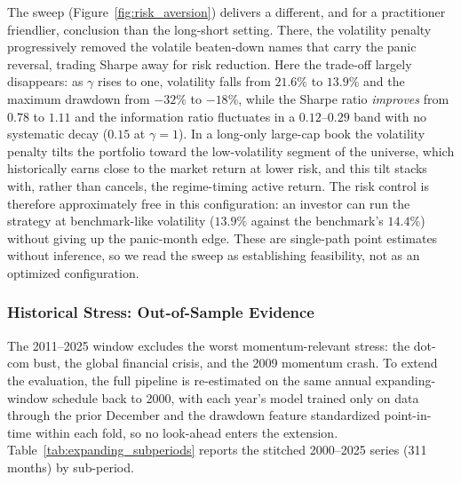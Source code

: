 The sweep (Figure~\ref{fig:risk_aversion}) delivers a different, and for a practitioner friendlier, conclusion than the long-short setting. There, the volatility penalty progressively removed the volatile beaten-down names that carry the panic reversal, trading Sharpe away for risk reduction. Here the trade-off largely disappears: as $\gamma$ rises to one, volatility falls from $21.6\%$ to $13.9\%$ and the maximum drawdown from $-32\%$ to $-18\%$, while the Sharpe ratio \emph{improves} from $0.78$ to $1.11$ and the information ratio fluctuates in a $0.12$--$0.29$ band with no systematic decay ($0.15$ at $\gamma = 1$). In a long-only large-cap book the volatility penalty tilts the portfolio toward the low-volatility segment of the universe, which historically earns close to the market return at lower risk, and this tilt stacks with, rather than cancels, the regime-timing active return. The risk control is therefore approximately free in this configuration: an investor can run the strategy at benchmark-like volatility ($13.9\%$ against the benchmark's $14.4\%$) without giving up the panic-month edge. These are single-path point estimates without inference, so we read the sweep as establishing feasibility, not as an optimized configuration.

\subsubsection{Historical Stress: Out-of-Sample Evidence}\label{sec:historical_stress}

The 2011--2025 window excludes the worst momentum-relevant stress: the dot-com bust, the global financial crisis, and the 2009 momentum crash. To extend the evaluation, the full pipeline is re-estimated on the same annual expanding-window schedule back to 2000, with each year's model trained only on data through the prior December and the drawdown feature standardized point-in-time within each fold, so no look-ahead enters the extension. Table~\ref{tab:expanding_subperiods} reports the stitched 2000--2025 series (311 months) by sub-period.



